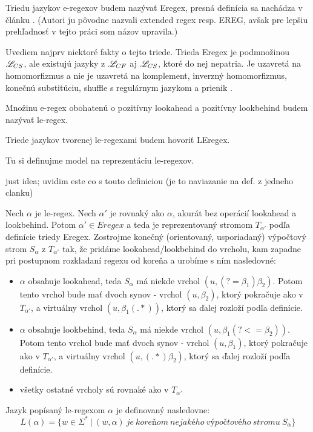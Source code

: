 Triedu jazykov e-regexov budem nazývať Eregex, presná definícia sa nachádza v článku \cite{ExtendedRegexPower}. (Autori ju pôvodne nazvali extended regex resp. EREG, avšak pre lepšiu prehľadnosť v tejto práci som názov upravila.)

Uvediem najprv niektoré fakty o tejto triede.
Trieda Eregex je podmnožinou $\mathscr{L}_{CS}$, ale existujú jazyky z $\mathscr{L}_{CF}$ aj $\mathscr{L}_{CS}$, ktoré do nej nepatria. Je uzavretá na homomorfizmus a nie je uzavretá na komplement, inverzný homomorfizmus, konečnú substitúciu, shuffle s regulárnym jazykom \cite{ExtendedRegexPower} a prienik \cite{ExtendedRegexIntersec}.

\begin{df}
Množinu e-regex obohatenú o pozitívny lookahead a pozitívny lookbehind budem nazývať le-regex.
\end{df}

\begin{df}
Triede jazykov tvorenej le-regexami budem hovoriť LEregex.
\end{df}

Tu si definujme model na reprezentáciu le-regexov.

\todo just idea; uvidim este co s touto definiciou (je to naviazanie na def. z jedneho clanku)
\begin{df}
Nech $\alpha$ je le-regex. Nech $\alpha '$ je rovnaký ako $\alpha$, akurát bez operácií lookahead a lookbehind. Potom $\alpha ' \in Eregex$ a teda je reprezentovaný stromom $T_{\alpha '}$ podľa definície triedy Eregex. Zostrojme konečný (orientovaný, usporiadaný) výpočtový strom $S_\alpha$ z $T_{\alpha '}$ tak, že pridáme lookahead/lookbehind do vrcholu, kam zapadne pri postupnom rozkladaní regexu od koreňa a urobíme s ním nasledovné:
\begin{itemize}
  \item  $\alpha$ obsahuje lookahead, teda $S_\alpha$ má niekde vrchol $(u, (?=\beta_1 )\beta_2)$. Potom tento vrchol bude mať dvoch synov - vrchol $(u,\beta_2)$, ktorý pokračuje ako v $T_{\alpha '}$, a virtuálny vrchol $(u,\beta_1 (.*))$, ktorý sa ďalej rozloží podľa definície.
  \item  $\alpha$ obsahuje lookbehind, teda $S_\alpha$ má niekde vrchol $(u, \beta_1(?<=\beta_2))$. Potom tento vrchol bude mať dvoch synov - vrchol $(u,\beta_1)$, ktorý pokračuje ako v $T_{\alpha '}$, a virtuálny vrchol $(u,(.*)\beta_2)$, ktorý sa ďalej rozloží podľa definície.
  \item všetky ostatné vrcholy sú rovnaké ako v $T_{\alpha '}$
\end{itemize}
Jazyk popísaný le-regexom $\alpha$ je definovaný nasledovne: 
$$L(\alpha ) = \lbrace w \in \Sigma ^* ~|~ (w, \alpha)~je~koreňom~nejakého~výpočtového~stromu~S_\alpha \rbrace$$
\end{df}

